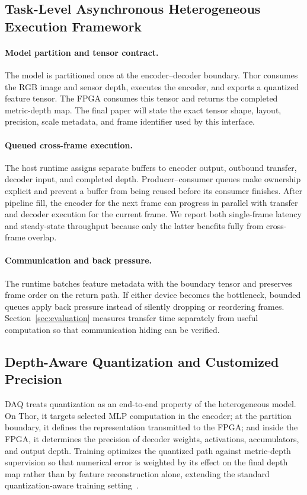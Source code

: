 \subsection{Task-Level Asynchronous Heterogeneous Execution Framework}
\label{sec:framework}

\paragraph{Model partition and tensor contract.}
The model is partitioned once at the encoder--decoder boundary.  Thor consumes
the RGB image and sensor depth, executes the encoder, and exports a quantized
feature tensor.  The FPGA consumes this tensor and returns the completed
metric-depth map.  The final paper will state the exact tensor shape, layout,
precision, scale metadata, and frame identifier used by this interface.

\paragraph{Queued cross-frame execution.}
The host runtime assigns separate buffers to encoder output, outbound
transfer, decoder input, and completed depth.  Producer--consumer queues make
ownership explicit and prevent a buffer from being reused before its consumer
finishes.  After pipeline fill, the encoder for the next frame can progress in
parallel with transfer and decoder execution for the current frame.  We report
both single-frame latency and steady-state throughput because only the latter
benefits fully from cross-frame overlap.

\paragraph{Communication and back pressure.}
The runtime batches feature metadata with the boundary tensor and preserves
frame order on the return path.  If either device becomes the bottleneck,
bounded queues apply back pressure instead of silently dropping or reordering
frames.  Section~\ref{sec:evaluation} measures transfer time separately from
useful computation so that communication hiding can be verified.

\subsection{Depth-Aware Quantization and Customized Precision}
\label{sec:daq}

DAQ treats quantization as an end-to-end property of the heterogeneous model.
On Thor, it targets selected MLP computation in the encoder; at the partition
boundary, it defines the representation transmitted to the FPGA; and inside
the FPGA, it determines the precision of decoder weights, activations,
accumulators, and output depth.  Training optimizes the quantized path against
metric-depth supervision so that numerical error is weighted by its effect on
the final depth map rather than by feature reconstruction alone, extending the
standard quantization-aware training setting~\cite{jacob2018quantization}.

